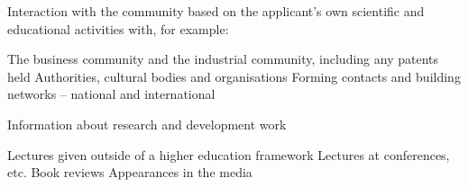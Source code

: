 Interaction with the community based on the applicant’s own scientific
and educational activities with, for example:

The business community and the industrial community, including any patents held
Authorities, cultural bodies and organisations
Forming contacts and building networks – national and international

Information about research and development work

Lectures given outside of a higher education framework
Lectures at conferences, etc.
Book reviews
Appearances in the media

